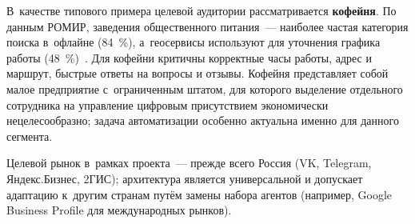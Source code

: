 В~качестве типового примера целевой аудитории рассматривается \textbf{кофейня}. По данным РОМИР, заведения общественного питания~--- наиболее частая категория поиска в~офлайне (84~\%), а~геосервисы используют для уточнения графика работы (48~\%)~\cite{src:35}. Для кофейни критичны корректные часы работы, адрес и маршрут, быстрые ответы на вопросы и отзывы. Кофейня представляет собой малое предприятие с~ограниченным штатом, для которого выделение отдельного сотрудника на управление цифровым присутствием экономически нецелесообразно; задача автоматизации особенно актуальна именно для данного сегмента.

Целевой рынок в~рамках проекта~--- прежде всего Россия (VK, Telegram, Яндекс.Бизнес, 2ГИС); архитектура является универсальной и допускает адаптацию к~другим странам путём замены набора агентов (например, Google Business Profile для международных рынков).
